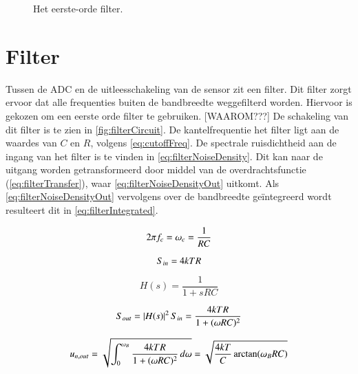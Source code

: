 \begin{figure}[ht]
    \centering
    \def\svgwidth{0.3\textwidth}
    
    \caption{Het eerste-orde filter.}
    \label{fig:filterCircuit}
\end{figure}

\section{Filter}
Tussen de ADC en de uitleesschakeling van de sensor zit een filter. Dit filter zorgt ervoor dat alle frequenties buiten de bandbreedte weggefilterd worden. Hiervoor is gekozen om een eerste orde filter te gebruiken. [WAAROM???]
De schakeling van dit filter is te zien in \autoref{fig:filterCircuit}. De kantelfrequentie het filter ligt aan de waardes van $C$ en $R$, volgens \autoref{eq:cutoffFreq}.
De spectrale ruisdichtheid aan de ingang van het filter is te vinden in \autoref{eq:filterNoiseDensity}.
Dit kan naar de uitgang worden getransformeerd door middel van de overdrachtsfunctie (\autoref{eq:filterTransfer}), waar \autoref{eq:filterNoiseDensityOut} uitkomt.
Als \autoref{eq:filterNoiseDensityOut} vervolgens over de bandbreedte geïntegreerd wordt resulteert dit in \autoref{eq:filterIntegrated}.

\begin{equation} \label{eq:cutoffFreq}
    2\pi f_c = \omega_c = \frac{1}{RC}
    \tagaddtext{[\si{\radian\per\second}]}
\end{equation}

\begin{equation} \label{eq:filterNoiseDensity}
    S_{in} = 4kTR
    \tagaddtext{[\si{\volt\squared\per\hertz}]}
\end{equation}

\begin{equation} \label{eq:filterTransfer}
    H(s) = \frac{1}{1+sRC}
\end{equation}

\begin{equation} \label{eq:filterNoiseDensityOut}
    S_{out} = \left|H(s)\right|^2S_{in} = \frac{4kTR}{1+(\omega R C)^2}
    \tagaddtext{[\si{\volt\squared\per\hertz}]}
\end{equation}

\begin{equation} \label{eq:filterIntegrated}
    u_{n,out} = \sqrt{\int_{0}^{\omega_B} \frac{4kTR}{1+(\omega R C)^2} \, d\omega} = \sqrt{\frac{4kT}{C} \arctan(\omega_BRC)}
    \tagaddtext{[\si{\volt}]}
\end{equation}


